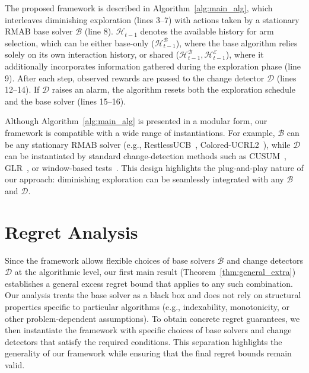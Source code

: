 \documentclass[twoside]{article}
\theoremstyle{plain}
\theoremstyle{definition}
\theoremstyle{remark}
\begin{document}
\vspace{-10pt}
The proposed framework is described in Algorithm~\ref{alg:main_alg}, 
which interleaves diminishing exploration (lines 3--7) with actions taken by a 
stationary RMAB base solver $\mathcal{B}$ (line 8). $\mathcal{H}_{t-1}$ denotes the available history for arm selection, which can be either base-only ($\mathcal{H}^{\mathcal{B}}_{t-1}$), where the base algorithm relies solely on its own interaction history, or shared (${\mathcal{H}^{\mathcal{B}}_{t-1},\mathcal{H}^{\mathcal{E}}_{t-1}}$), where it additionally incorporates information gathered during the exploration phase (line 9).
After each step, observed rewards are passed to the change detector $\mathcal{D}$ 
(lines 12--14). 
If $\mathcal{D}$ raises an alarm, the algorithm resets both the exploration 
schedule and the base solver (lines 15--16). 

Although Algorithm~\ref{alg:main_alg} is presented in a modular form, 
our framework is compatible with a wide range of instantiations. 
For example, $\mathcal{B}$ can be any stationary RMAB solver 
(e.g., RestlessUCB~\citep{wang2020restless}, Colored-UCRL2~\citep{ortner2012regret}), 
while $\mathcal{D}$ can be instantiated by standard change-detection methods such as 
CUSUM~\citep{liu2018change}, GLR~\citep{besson2022efficient}, 
or window-based tests~\citep{cao2019nearly}. 
This design highlights the plug-and-play nature of our approach: 
diminishing exploration can be seamlessly integrated with any $\mathcal{B}$ and $\mathcal{D}$.



\vspace{-5pt}
\section{Regret Analysis}
\label{sec:analysis}
\vspace{-5pt}


Since the framework allows flexible choices of base solvers $\mathcal{B}$ and change detectors $\mathcal{D}$ at the algorithmic level, our first main result (Theorem~\ref{thm:general_extra}) establishes a general excess regret bound that applies to any such combination. Our analysis treats the base solver as a black box and does not rely on structural properties specific to particular algorithms (e.g., indexability, monotonicity, or other problem-dependent assumptions). To obtain concrete regret guarantees, we then instantiate the framework with specific choices of base solvers and change detectors that satisfy the required conditions. This separation highlights the generality of our framework while ensuring that the final regret bounds remain valid.
\end{document}

